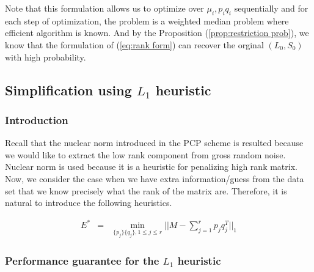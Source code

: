 Note that this formulation allows us to optimize over $\mu_{i},p_{i}q_{i}$
sequentially and for each step of optimization, the problem is a weighted
median problem where efficient algorithm is known. And by the Proposition
(\ref{prop:restriction prob}), we know that the formulation of (\ref{eq:rank form})
can recover the orginal $(L_{0},S_{0})$ with high probability.


\subsection{Simplification using $L_{1}$ heuristic}


\subsubsection{Introduction}

Recall that the nuclear norm introduced in the PCP scheme is resulted
because we would like to extract the low rank component from gross
random noise. Nuclear norm is used because it is a heuristic for penalizing
high rank matrix. Now, we consider the case when we have extra information/guess
from the data set that we know precisely what the rank of the matrix
are. Therefore, it is natural to introduce the following heuristics.

\begin{eqnarray}
E^{*} & = & \min_{\{p_{j}\}\{q_{j}\},1\le j\le r}||M-\sum_{j=1}^{r}p_{j}q_{j}^{T}||_{1}\label{heu}
\end{eqnarray}



\subsubsection{Performance guarantee for the $L_1$ heuristic}

